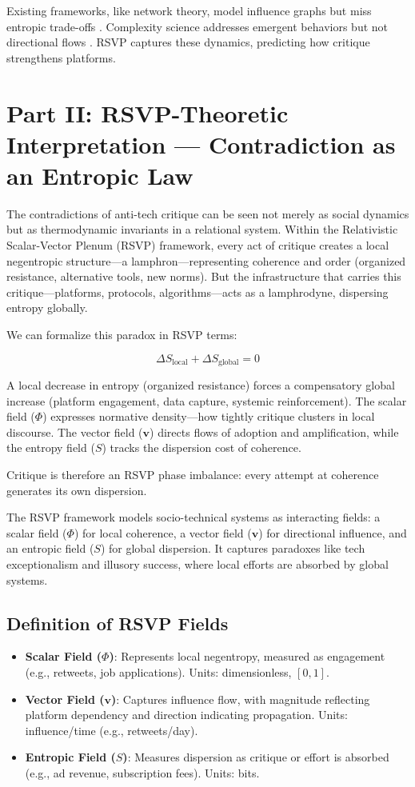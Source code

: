 \documentclass{article}
\begin{document}
Existing frameworks, like network theory, model influence graphs but miss entropic trade-offs \cite{newman2010networks}. Complexity science addresses emergent behaviors but not directional flows \cite{mitchell2009complexity}. RSVP captures these dynamics, predicting how critique strengthens platforms.

\section{Part II: RSVP-Theoretic Interpretation — Contradiction as an Entropic Law}

The contradictions of anti-tech critique can be seen not merely as social dynamics but as thermodynamic invariants in a relational system. Within the Relativistic Scalar-Vector Plenum (RSVP) framework, every act of critique creates a local negentropic structure—a lamphron—representing coherence and order (organized resistance, alternative tools, new norms). But the infrastructure that carries this critique—platforms, protocols, algorithms—acts as a lamphrodyne, dispersing entropy globally.

We can formalize this paradox in RSVP terms:

\[
\Delta S_{\text{local}} + \Delta S_{\text{global}} = 0
\]

A local decrease in entropy (organized resistance) forces a compensatory global increase (platform engagement, data capture, systemic reinforcement). The scalar field ($\Phi$) expresses normative density—how tightly critique clusters in local discourse. The vector field ($\mathbf{v}$) directs flows of adoption and amplification, while the entropy field ($S$) tracks the dispersion cost of coherence.

Critique is therefore an RSVP phase imbalance: every attempt at coherence generates its own dispersion.

The RSVP framework models socio-technical systems as interacting fields: a scalar field ($\Phi$) for local coherence, a vector field ($\mathbf{v}$) for directional influence, and an entropic field ($S$) for global dispersion. It captures paradoxes like tech exceptionalism and illusory success, where local efforts are absorbed by global systems.

\subsection{Definition of RSVP Fields}

\begin{itemize}
    \item \textbf{Scalar Field ($\Phi$)}: Represents local negentropy, measured as engagement (e.g., retweets, job applications). Units: dimensionless, $[0,1]$.
    \item \textbf{Vector Field ($\mathbf{v}$)}: Captures influence flow, with magnitude reflecting platform dependency and direction indicating propagation. Units: influence/time (e.g., retweets/day).
    \item \textbf{Entropic Field ($S$)}: Measures dispersion as critique or effort is absorbed (e.g., ad revenue, subscription fees). Units: bits.
\end{itemize}
\end{document}

